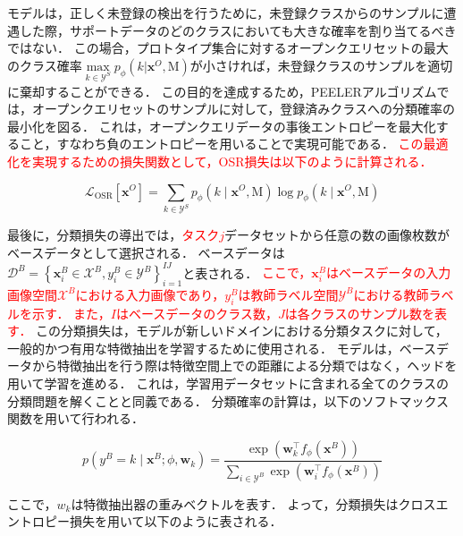 \documentclass[a4paper,11pt,nomag]{jsreport}
\begin{document}
モデルは，正しく未登録の検出を行うために，未登録クラスからのサンプルに遭遇した際，サポートデータのどのクラスにおいても大きな確率を割り当てるべきではない．
この場合，プロトタイプ集合に対するオープンクエリセットの最大のクラス確率$\underset{k \in \mathcal{Y}^S}{\max} {p_{\phi}(k|\bm{x}^O, \mathrm{M})}$が小さければ，未登録クラスのサンプルを適切に棄却することができる．
この目的を達成するため，PEELERアルゴリズムでは，オープンクエリセットのサンプルに対して，登録済みクラスへの分類確率の最小化を図る．
これは，オープンクエリデータの事後エントロピーを最大化すること，すなわち負のエントロピーを用いることで実現可能である．
\textcolor{red}{この最適化を実現するための損失関数として，OSR損失は以下のように計算される．}

\begin{equation}
    \mathcal{L}_{\mathrm{OSR}}[\bm{x}^O]
                = \sum_{k \in \mathcal{Y}^S} {p_{\phi}(k \mid \bm{x}^O, \mathrm{M}) \log{p_{\phi}(k \mid \bm{x}^O, \mathrm{M})}}
\end{equation}

最後に，分類損失の導出では，\textcolor{red}{タスク$j$}データセットから任意の数の画像枚数がベースデータとして選択される．
ベースデータは$\mathcal{D}^B = \left\{ \bm{x}^B_i \in \mathcal{X}^B, y^B_i \in \mathcal{Y}^B \right\}^{I J}_{i=1}$と表される．
\textcolor{red}{ここで，$\bm{x}^B_i$はベースデータの入力画像空間$\mathcal{X}^B$における入力画像であり，$y^B_i$は教師ラベル空間$\mathcal{Y}^B$における教師ラベルを示す．
また，$I$はベースデータのクラス数，$J$は各クラスのサンプル数を表す．}
この分類損失は，モデルが新しいドメインにおける分類タスクに対して，一般的かつ有用な特徴抽出を学習するために使用される．
モデルは，ベースデータから特徴抽出を行う際は特徴空間上での距離による分類ではなく，ヘッドを用いて学習を進める．
これは，学習用データセットに含まれる全てのクラスの分類問題を解くことと同義である．
分類確率の計算は，以下のソフトマックス関数を用いて行われる．

\begin{equation}
    p(y^B=k \mid \bm{x}^B;\phi,\mathbf{w}_k) 
        = \frac{\exp(\mathbf{w}_k^{\top} f_{\phi}(\bm{x}^B))}{\sum_{i \in \mathcal{Y}^B} \exp(\mathbf{w}_{i}^{\top} f_{\phi}(\bm{x}^B))}
\end{equation}

\noindent
ここで，$w_k$は特徴抽出器の重みベクトルを表す．
よって，分類損失はクロスエントロピー損失を用いて以下のように表される．
\end{document}
